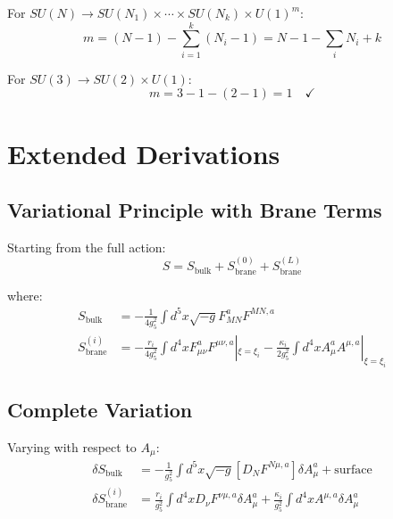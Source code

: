 \documentclass[11pt,a4paper]{article}
\begin{document}
For $SU(N) \to SU(N_1) \times \cdots \times SU(N_k) \times U(1)^m$:
\begin{equation}
  m = (N-1) - \sum_{i=1}^k (N_i - 1) = N - 1 - \sum_i N_i + k
  \label{eq:u1-formula}
\end{equation}

For $SU(3) \to SU(2) \times U(1)$:
\begin{equation}
  m = 3 - 1 - (2 - 1) = 1 \quad \checkmark
  \label{eq:u1-su3}
\end{equation}

\section{Extended Derivations}
\label{app:extended}

\subsection{Variational Principle with Brane Terms}

Starting from the full action:
\begin{equation}
  S = S_{\text{bulk}} + S_{\text{brane}}^{(0)} + S_{\text{brane}}^{(L)}
  \label{eq:full-action}
\end{equation}

where:
\begin{align}
  S_{\text{bulk}} &= -\frac{1}{4g_5^2} \int d^5x \sqrt{-g} F_{MN}^a F^{MN,a}
  \label{eq:bulk-full} \\
  S_{\text{brane}}^{(i)} &= -\frac{r_i}{4g_5^2} \int d^4x F_{\mu\nu}^a F^{\mu\nu,a}|_{\xi=\xi_i}
    - \frac{\kappa_i}{2g_5^2} \int d^4x A_\mu^a A^{\mu,a}|_{\xi=\xi_i}
  \label{eq:brane-full}
\end{align}

\subsection{Complete Variation}

Varying with respect to $A_\mu$:
\begin{align}
  \delta S_{\text{bulk}} &= -\frac{1}{g_5^2} \int d^5x \sqrt{-g} \left[
    D_N F^{N\mu,a} \right] \delta A_\mu^a + \text{surface}
  \label{eq:var-bulk} \\
  \delta S_{\text{brane}}^{(i)} &= \frac{r_i}{g_5^2} \int d^4x D_\nu F^{\nu\mu,a} \delta A_\mu^a
    + \frac{\kappa_i}{g_5^2} \int d^4x A^{\mu,a} \delta A_\mu^a
  \label{eq:var-brane}
\end{align}
\end{document}
